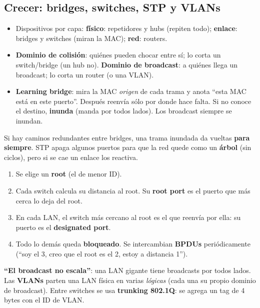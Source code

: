 \documentclass[10pt,a4paper]{article}
\newcommand{\term}[1]{\textbf{\color{azul}#1}}
\begin{document}
\subsection{Crecer: bridges, switches, STP y VLANs}
\begin{itemize}
  \item Dispositivos por capa: \textbf{físico}: repetidores y hubs (repiten todo); \textbf{enlace}: bridges y switches (miran la MAC); \textbf{red}: routers.
  \item \term{Dominio de colisión}: quiénes pueden chocar entre sí; lo corta un switch/bridge (un hub no).
        \term{Dominio de broadcast}: a quiénes llega un broadcast; lo corta un router (o una VLAN).
  \item \term{Learning bridge}: mira la MAC \emph{origen} de cada trama y anota ``esta MAC está en este puerto''. Después reenvía sólo por donde hace falta.
        Si no conoce el destino, \textbf{inunda} (manda por todos lados). Los broadcast siempre se inundan.
\end{itemize}
\begin{idea}
Si hay caminos redundantes entre bridges, una trama inundada da vueltas \textbf{para siempre}. STP apaga algunos puertos para que la red quede como un \textbf{árbol} (sin ciclos), pero si se cae un enlace los reactiva.
\end{idea}
\begin{enumerate}
  \item Se elige un \term{root} (el de menor ID).
  \item Cada switch calcula su distancia al root. Su \term{root port} es el puerto que más cerca lo deja del root.
  \item En cada LAN, el switch más cercano al root es el que reenvía por ella: su puerto es el \term{designated port}.
  \item Todo lo demás queda \textbf{bloqueado}. Se intercambian \term{BPDUs} periódicamente (``soy el 3, creo que el root es el 2, estoy a distancia 1'').
\end{enumerate}
\textbf{``El broadcast no escala''}: una LAN gigante tiene broadcasts por todos lados. Las \term{VLANs} parten una LAN física en varias \emph{lógicas}
(cada una su propio dominio de broadcast). Entre switches se usa \term{trunking 802.1Q}: se agrega un tag de 4 bytes con el ID de VLAN.
\end{document}
